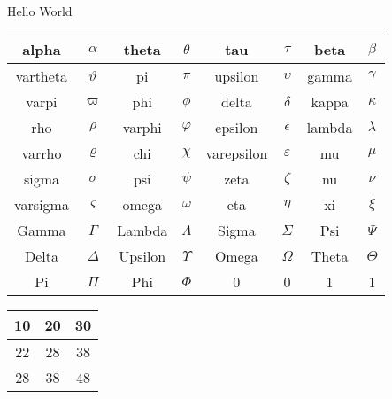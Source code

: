 \documentclass[UTF8]{article}
\begin{document}
Hello World

\begin{tabular}{|c|c|c|c|c|c|c|c|} \hline
alpha    & $\alpha$    & theta   & $\theta$   & tau        & $\tau$        & beta   & $\beta$   \\ \hline
vartheta & $\vartheta$ & pi      & $\pi$      & upsilon    & $\upsilon$    & gamma  & $\gamma$  \\ \hline
varpi    & $\varpi$    & phi     & $\phi$     & delta      & $\delta$      & kappa  & $\kappa$  \\ \hline
rho      & $\rho$      & varphi  & $\varphi$  & epsilon    & $\epsilon$    & lambda & $\lambda$ \\ \hline
varrho   & $\varrho$   & chi     & $\chi$     & varepsilon & $\varepsilon$ & mu     & $\mu$     \\ \hline
sigma    & $\sigma$    & psi     & $\psi$     & zeta       & $\zeta$       & nu     & $\nu$     \\ \hline
varsigma & $\varsigma$ & omega   & $\omega$   & eta        & $\eta$        & xi     & $\xi$     \\ \hline
Gamma    & $\Gamma$    & Lambda  & $\Lambda$  & Sigma      & $\Sigma$      & Psi    & $\Psi$    \\ \hline
Delta    & $\Delta$    & Upsilon & $\Upsilon$ & Omega      & $\Omega$      & Theta  & $\Theta$  \\ \hline
Pi       & $\Pi$       & Phi     & $\Phi$     & 0          & 0             & 1      & 1         \\ \hline
\end{tabular} 

\begin{tabular}{|c|c|c|} \hline
10 & 20 & 30  \\ \hline
22 & 28 & 38  \\ \hline
28 & 38 & 48  \\ \hline
\end{tabular} 

\end{document}
